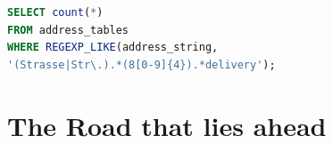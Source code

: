 \documentclass[conference]{IEEEtran}
\begin{document}
\begin{lstlisting}[language=SQL,frame=single,caption={Regulärer Ausdruck aus \cite{sidler_accelerating_2017}},label={lst:regexp}]
SELECT count(*) 
FROM address_tables
WHERE REGEXP_LIKE(address_string,
'(Strasse|Str\.).*(8[0-9]{4}).*delivery');
\end{lstlisting}

\section{The Road that lies ahead}



\end{document}
